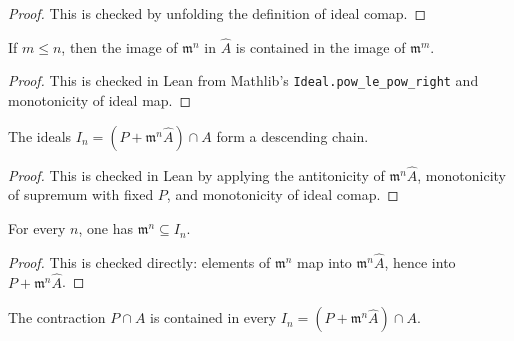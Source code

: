 \begin{proof}
  This is checked by unfolding the definition of ideal comap.
\end{proof}

\begin{lemma}
  \label{lem:adic_completion_power_image_antitone}
  If \(m\le n\), then the image of \(\mathfrak m^n\) in \(\widehat A\) is
  contained in the image of \(\mathfrak m^m\).
\end{lemma}

\begin{proof}
  This is checked in Lean from Mathlib's
  \texttt{Ideal.pow\_le\_pow\_right} and monotonicity of ideal map.
\end{proof}

\begin{lemma}
  \label{lem:bad_prime_contraction_chain_antitone}
  The ideals \(I_n=(P+\mathfrak m^n\widehat A)\cap A\) form a descending
  chain.
\end{lemma}

\begin{proof}
  This is checked in Lean by applying the antitonicity of
  \(\mathfrak m^n\widehat A\), monotonicity of supremum with fixed \(P\), and
  monotonicity of ideal comap.
\end{proof}

\begin{lemma}
  \label{lem:power_le_bad_prime_contraction_chain}
  For every \(n\), one has \(\mathfrak m^n\subseteq I_n\).
\end{lemma}

\begin{proof}
  This is checked directly: elements of \(\mathfrak m^n\) map into
  \(\mathfrak m^n\widehat A\), hence into \(P+\mathfrak m^n\widehat A\).
\end{proof}

\begin{lemma}
  \label{lem:comap_le_bad_prime_contraction_chain}
  The contraction \(P\cap A\) is contained in every
  \(I_n=(P+\mathfrak m^n\widehat A)\cap A\).
\end{lemma}

